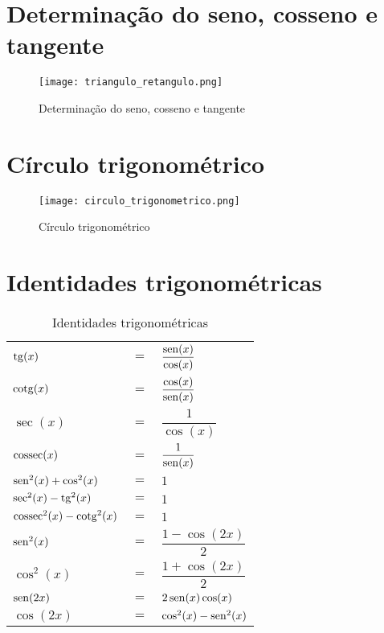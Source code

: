 \section{Determinação do seno, cosseno e tangente}
	\begin{figure}[htb]
		\caption{Determinação do seno, cosseno e tangente}
		\label{triangulo_retangulo}
		\centering
		\texttt{[image: triangulo\_retangulo.png]}		
	\end{figure}
	
\section{Círculo trigonométrico}
	\begin{figure}[htb]
		\caption{Círculo trigonométrico}
		\label{circulo_trigonometrico}
		\centering
		\texttt{[image: circulo\_trigonometrico.png]}		
	\end{figure}
	
\section{Identidades trigonométricas}
	\begin{table}[htb]
		\caption{Identidades trigonométricas}
		\label{identidades_trigonometricas}
		\centering
		\begin{tabular}{|lcl|}
			$\operatorname{tg}(x)$                    & $=$ & $\dfrac{\operatorname{sen}(x)}{\cos(x)}$ \\
			$\operatorname{cotg}(x)$                  & $=$ & $\dfrac{\cos(x)}{\operatorname{sen}(x)}$ \\
			$\sec(x)$                   & $=$ & $\dfrac{1}{\cos(x)}$       \\
			$\operatorname{cossec}(x)$                & $=$ & $\dfrac{1}{\operatorname{sen}(x)}$       \\
			$\operatorname{sen}^2(x) + \cos^2(x)$     & $=$ & $1$                        \\
			$\sec^2(x) - \operatorname{tg}^2(x)$      & $=$ & $1$                        \\
			$\operatorname{cossec}^2(x) - \operatorname{cotg}^2(x)$ & $=$ & $1$                        \\
			$\operatorname{sen}^2(x)$                 & $=$ & $\dfrac{1 - \cos(2x)}{2}$  \\
			$\cos^2(x)$                 & $=$ & $\dfrac{1 + \cos(2x)}{2}$  \\
			$\operatorname{sen}(2x)$                  & $=$ & $2\operatorname{sen}(x)\cos(x)$          \\
			$\cos(2x)$                  & $=$ & $\cos^2(x) - \operatorname{sen}^2(x)$
		\end{tabular}		
	\end{table}
	
